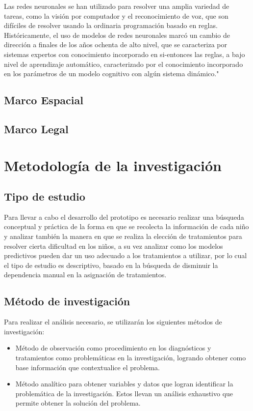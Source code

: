 		Las redes neuronales se han utilizado para resolver una amplia variedad de tareas, como la visión por computador y el reconocimiento de voz, que son difíciles de resolver usando la ordinaria programación basado en reglas. Históricamente, el uso de modelos de redes neuronales marcó un cambio de dirección a finales de los años ochenta de alto nivel, que se caracteriza por sistemas expertos con conocimiento incorporado en si-entonces las reglas, a bajo nivel de aprendizaje automático, caracterizado por el conocimiento incorporado en los parámetros de un modelo cognitivo con algún sistema dinámico."
	\subsection{Marco Espacial}
	\subsection{Marco Legal}
\section{Metodología de la investigación}
	\subsection{Tipo de estudio}
		Para llevar a cabo el desarrollo del prototipo es necesario realizar una búsqueda conceptual y práctica de la forma en que se recolecta la información de cada niño y analizar también la manera en que se realiza la elección de tratamientos para resolver cierta dificultad en los niños, a su vez analizar como los modelos predictivos pueden dar un uso adecuado a los tratamientos a utilizar, por lo cual el tipo de estudio es descriptivo, basado en la búsqueda de disminuir la dependencia manual en la asignación de tratamientos.
		\subsection{Método de investigación}
		Para realizar el análisis necesario, se utilizarán los siguientes métodos de investigación:
		\begin{itemize}
			\item Método de observación como procedimiento en los diagnósticos y tratamientos como problemáticas en la investigación, logrando obtener como base información que contextualice el problema.
			\item Método analítico para obtener variables y datos que logran identificar la problemática de la investigación. Estos llevan un análisis exhaustivo que permite obtener la solución del problema.
		\end{itemize}
